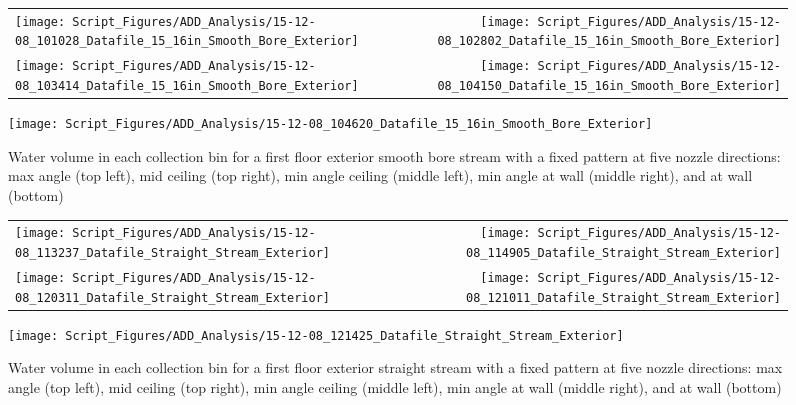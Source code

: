 \documentclass{article}
\begin{document}
\begin{figure}[ht]
\begin{tabular*}{\textwidth}{lr}
\texttt{[image: Script\_Figures/ADD\_Analysis/15-12-08\_101028\_Datafile\_15\_16in\_Smooth\_Bore\_Exterior]} &
\texttt{[image: Script\_Figures/ADD\_Analysis/15-12-08\_102802\_Datafile\_15\_16in\_Smooth\_Bore\_Exterior]} \\
\texttt{[image: Script\_Figures/ADD\_Analysis/15-12-08\_103414\_Datafile\_15\_16in\_Smooth\_Bore\_Exterior]} &
\texttt{[image: Script\_Figures/ADD\_Analysis/15-12-08\_104150\_Datafile\_15\_16in\_Smooth\_Bore\_Exterior]} \\
\end{tabular*}
\centering
\texttt{[image: Script\_Figures/ADD\_Analysis/15-12-08\_104620\_Datafile\_15\_16in\_Smooth\_Bore\_Exterior]} \\
\caption{Water volume in each collection bin for a first floor exterior smooth bore stream with a fixed pattern at five nozzle directions: max angle (top left), mid ceiling (top right), min angle ceiling (middle left), min angle at wall (middle right), and at wall (bottom)}
\label{fig:Exterior_First_Floor_Varying_Nozzle_Directions_SB_Fixed_Pattern}
\end{figure}

\begin{figure}[ht]
\begin{tabular*}{\textwidth}{lr}
\texttt{[image: Script\_Figures/ADD\_Analysis/15-12-08\_113237\_Datafile\_Straight\_Stream\_Exterior]} &
\texttt{[image: Script\_Figures/ADD\_Analysis/15-12-08\_114905\_Datafile\_Straight\_Stream\_Exterior]} \\
\texttt{[image: Script\_Figures/ADD\_Analysis/15-12-08\_120311\_Datafile\_Straight\_Stream\_Exterior]} &
\texttt{[image: Script\_Figures/ADD\_Analysis/15-12-08\_121011\_Datafile\_Straight\_Stream\_Exterior]} \\
\end{tabular*}
\centering
\texttt{[image: Script\_Figures/ADD\_Analysis/15-12-08\_121425\_Datafile\_Straight\_Stream\_Exterior]} \\
\caption{Water volume in each collection bin for a first floor exterior straight stream with a fixed pattern at five nozzle directions: max angle (top left), mid ceiling (top right), min angle ceiling (middle left), min angle at wall (middle right), and at wall (bottom)}
\label{fig:Exterior_First_Floor_Varying_Nozzle_Directions_SS_Fixed_Pattern}
\end{figure}
\end{document}
